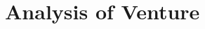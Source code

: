 \documentclass[letterpaper]{article}
\begin{document}
\section{Analysis of Venture}



\end{document}
